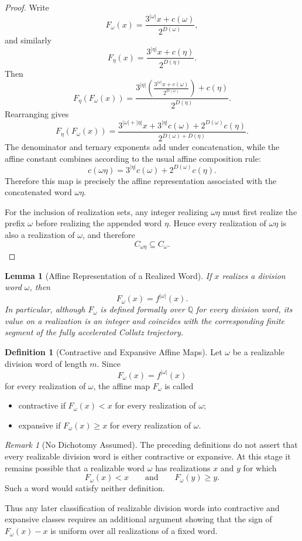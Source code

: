 \documentclass[12pt, oneside]{article}
\numberwithin{equation}{section}
\theoremstyle{definition}
\newtheorem{definition}{Definition}[section]
\theoremstyle{plain}
\newtheorem{lemma}[theorem]{Lemma}
\theoremstyle{remark}
\newtheorem*{remark}{Remark}
\begin{document}
\begin{proof}
Write
\[
F_\omega(x) = \frac{3^{|\omega|}x+c(\omega)}{2^{D(\omega)}},
\]
and similarly
\[
F_\eta(x) = \frac{3^{|\eta|}x+c(\eta)}{2^{D(\eta)}}.
\]
Then
\[
F_\eta(F_\omega(x)) = \frac{ 3^{|\eta|} \left( \frac{3^{|\omega|} x+c(\omega)} {2^{D(\omega)}} \right)+c(\eta) } {2^{D(\eta)}}.
\]
Rearranging gives
\[
F_\eta(F_\omega(x)) = \frac{ 3^{|\omega|+|\eta|}x+3^{|\eta|} c(\omega)+2^{D(\omega)}c(\eta) } {2^{D(\omega)+D(\eta)}}.
\]
The denominator and ternary exponents add under concatenation, while
the affine constant combines according to the usual affine composition
rule:
\[
c(\omega\eta) = 3^{|\eta|} c(\omega)+2^{D(\omega)}c(\eta).
\]
Therefore this map is precisely the affine representation associated
with the concatenated word $\omega\eta$.

For the inclusion of realization sets, any integer realizing $\omega\eta$
must first realize the prefix $\omega$ before realizing the appended word
$\eta$. Hence every realization of $\omega\eta$ is also a realization of
$\omega$, and therefore
\[
C_{\omega\eta}\subseteq C_\omega .
\]
\end{proof}

\begin{lemma}[Affine Representation of a Realized Word]
If \(x\) realizes a division word \(\omega\), then
\[
F_\omega(x)=f^{|\omega|}(x). 
\]
In particular, although \(F_\omega\) is defined formally over \(\mathbb Q\)
for every division word, its value on a realization is an integer and
coincides with the corresponding finite segment of the fully accelerated
Collatz trajectory.
\end{lemma}

\begin{definition}[Contractive and Expansive Affine Maps]
Let $\omega$ be a realizable division word of length $m$. Since
\[
F_\omega(x)=f^{|\omega|}(x)
\]
for every realization of $\omega$, the affine map $F_\omega$ is called
\begin{itemize}
\item contractive if \(F_\omega(x)<x\) for every realization of $\omega$;
\item expansive if \(F_\omega(x)\ge x\) for every realization of $\omega$.
\end{itemize}
\end{definition}

\begin{remark}[No Dichotomy Assumed]
The preceding definitions do not assert that every realizable division word
is either contractive or expansive. At this stage it remains possible that
a realizable word $\omega$ has realizations $x$ and $y$ for which
\[
F_\omega(x)<x
\qquad\text{and}\qquad
F_\omega(y)\ge y.
\]
Such a word would satisfy neither definition.

Thus any later classification of realizable division words into contractive
and expansive classes requires an additional argument showing that the sign
of $F_\omega(x)-x$ is uniform over all realizations of a fixed word.
\end{remark}
\end{document}
